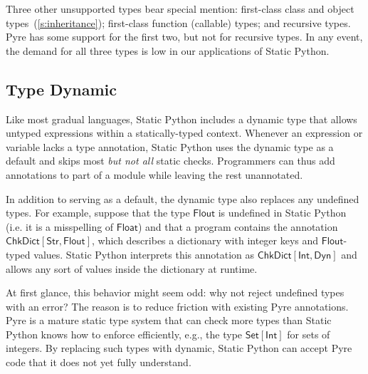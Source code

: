 \documentclass[english,cleveref,submission]{programming}
\newcommand{\SP}{Static Python}
\newcommand{\typefont}[1]{\mathsf{#1}}
\newcommand{\paramtype}[2]{#1[#2]}
\newcommand{\sptint}{\typefont{Int}}
\newcommand{\sptstr}{\typefont{Str}}
\newcommand{\sptfloat}{\typefont{Float}}
\newcommand{\sptflout}{\typefont{Flout}}
\newcommand{\sptdyn}{\typefont{Dyn}}
\newcommand{\sptset}[1]{\paramtype{\typefont{Set}}{#1}}
\newcommand{\sptchkdict}[2]{\paramtype{\typefont{ChkDict}}{#1, #2}}
\begin{document}
Three other unsupported types bear special mention:
first-class class and object types~(\cref{s:inheritance});
first-class function (callable) types; and
recursive types.
Pyre has some support for the first two, but not for recursive types.
In any event, the demand for all three types is low in our applications
of \SP{}.


\subsection{Type Dynamic}
\label{s:type-dynamic}


Like most gradual languages, \SP{} includes a dynamic type
that allows untyped expressions within a statically-typed context.
Whenever an expression or variable lacks a type annotation, \SP{} uses the
dynamic type as a default and skips most \emph{but not all}\/ static checks.
Programmers can thus add annotations to part of a module
while leaving the rest unannotated.

In addition to serving as a default, the dynamic type also replaces any undefined types.
For example, suppose that the type $\sptflout{}$ is undefined in \SP{}
(i.e. it is a misspelling of $\sptfloat$) and that a
program contains the annotation $\sptchkdict{\sptstr}{\sptflout}$, which describes a
dictionary with integer keys and $\sptflout$-typed values.
\SP{} interprets this annotation as $\sptchkdict{\sptint}{\sptdyn}$ and allows any sort
of values inside the dictionary at runtime.

At first glance, this behavior might seem odd: why not reject undefined types with an error?
The reason is to reduce friction with existing Pyre annotations.
Pyre is a mature static type system that can check more types than \SP{} knows how to enforce
efficiently, e.g., the type $\sptset{\sptint}$ for sets of integers.
By replacing such types with dynamic, \SP{} can accept Pyre code that it does not yet fully understand.
\end{document}
